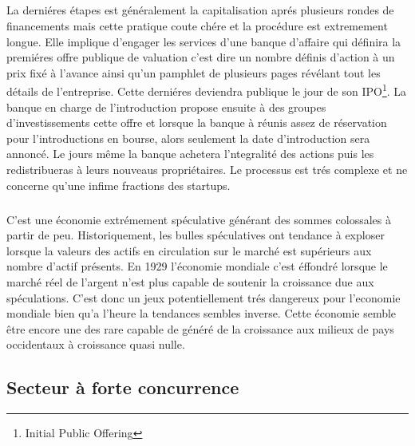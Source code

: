 \documentclass[11pt, a4paper ]{article}
\begin{document}
\begin{spacing}{1.5}
\subparagraph{}
La derniéres étapes est généralement la capitalisation aprés plusieurs rondes de financements mais cette pratique coute chére et la procédure est extremement longue. Elle implique d'engager les services d'une banque d'affaire qui définira la premiéres offre publique de valuation c'est dire un nombre définis d'action à un prix fixé à l'avance ainsi qu'un pamphlet de plusieurs pages révélant tout les détails de l'entreprise. Cette derniéres deviendra publique le jour de son IPO\footnote{ Initial Public Offering}. La banque en charge de l'introduction propose ensuite à des groupes d'investissements cette offre et lorsque la banque à réunis assez de réservation pour l'introductions en bourse, alors seulement la date d'introduction sera annoncé.  Le jours même la banque achetera l'ntegralité des actions puis les redistribueras à leurs nouveaus propriétaires.
Le processus est trés complexe et ne concerne qu'une infime fractions des startups.

\subparagraph{}
C'est une économie extrémement spéculative générant des sommes colossales à partir de peu. Historiquement, les bulles spéculatives ont tendance à exploser lorsque la valeurs des actifs en circulation sur le marché est supérieurs aux nombre d'actif présents. En 1929 l'économie mondiale c'est éffondré lorsque le marché réel de l'argent n'est plus capable de soutenir la croissance due aux spéculations. C'est donc un jeux potentiellement trés dangereux pour l'economie mondiale bien qu'a l'heure la tendances sembles inverse. Cette économie semble être encore une des rare capable de généré de la croissance aux milieux de pays occidentaux à croissance quasi nulle.



\subsection{Secteur à forte concurrence}



\end{spacing}
\end{document}
